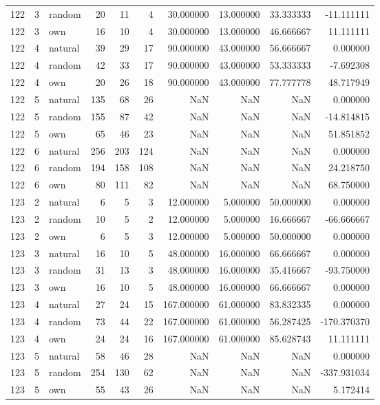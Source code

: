 \begin{table}[htbp]
\begin{tabular}{rrlrrrrrrr}
122 & 3 & random & 20 & 11 & 4 & 30.000000 & 13.000000 & 33.333333 & -11.111111 \\
122 & 3 & own & 16 & 10 & 4 & 30.000000 & 13.000000 & 46.666667 & 11.111111 \\
122 & 4 & natural & 39 & 29 & 17 & 90.000000 & 43.000000 & 56.666667 & 0.000000 \\
122 & 4 & random & 42 & 33 & 17 & 90.000000 & 43.000000 & 53.333333 & -7.692308 \\
122 & 4 & own & 20 & 26 & 18 & 90.000000 & 43.000000 & 77.777778 & 48.717949 \\
122 & 5 & natural & 135 & 68 & 26 & NaN & NaN & NaN & 0.000000 \\
122 & 5 & random & 155 & 87 & 42 & NaN & NaN & NaN & -14.814815 \\
122 & 5 & own & 65 & 46 & 23 & NaN & NaN & NaN & 51.851852 \\
122 & 6 & natural & 256 & 203 & 124 & NaN & NaN & NaN & 0.000000 \\
122 & 6 & random & 194 & 158 & 108 & NaN & NaN & NaN & 24.218750 \\
122 & 6 & own & 80 & 111 & 82 & NaN & NaN & NaN & 68.750000 \\
123 & 2 & natural & 6 & 5 & 3 & 12.000000 & 5.000000 & 50.000000 & 0.000000 \\
123 & 2 & random & 10 & 5 & 2 & 12.000000 & 5.000000 & 16.666667 & -66.666667 \\
123 & 2 & own & 6 & 5 & 3 & 12.000000 & 5.000000 & 50.000000 & 0.000000 \\
123 & 3 & natural & 16 & 10 & 5 & 48.000000 & 16.000000 & 66.666667 & 0.000000 \\
123 & 3 & random & 31 & 13 & 3 & 48.000000 & 16.000000 & 35.416667 & -93.750000 \\
123 & 3 & own & 16 & 10 & 5 & 48.000000 & 16.000000 & 66.666667 & 0.000000 \\
123 & 4 & natural & 27 & 24 & 15 & 167.000000 & 61.000000 & 83.832335 & 0.000000 \\
123 & 4 & random & 73 & 44 & 22 & 167.000000 & 61.000000 & 56.287425 & -170.370370 \\
123 & 4 & own & 24 & 24 & 16 & 167.000000 & 61.000000 & 85.628743 & 11.111111 \\
123 & 5 & natural & 58 & 46 & 28 & NaN & NaN & NaN & 0.000000 \\
123 & 5 & random & 254 & 130 & 62 & NaN & NaN & NaN & -337.931034 \\
123 & 5 & own & 55 & 43 & 26 & NaN & NaN & NaN & 5.172414 \\

\end{tabular}
\end{table}

